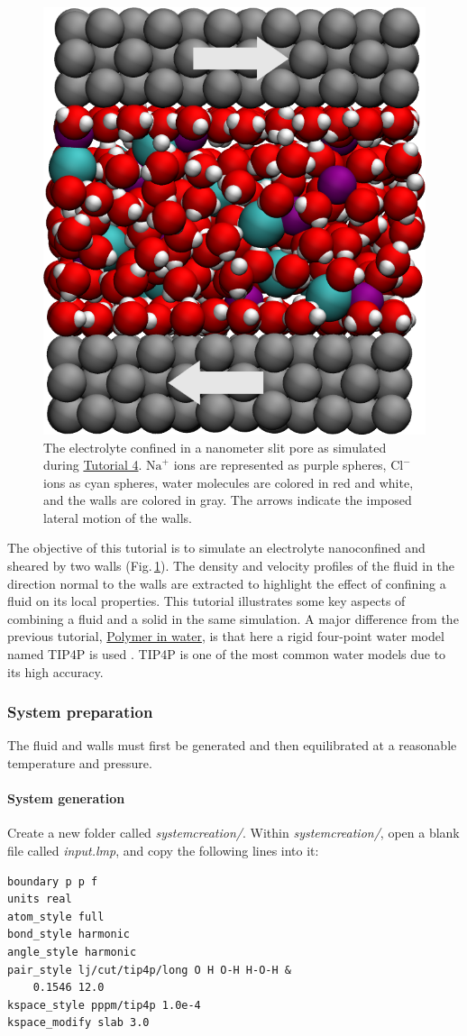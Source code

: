 \documentclass[9pt,tutorial]{livecoms}
\begin{document}
\begin{figure}
\centering
\includegraphics[width=0.55\linewidth]{NANOSHEAR}
\caption{The electrolyte confined in a nanometer slit pore as simulated during
\hyperref[sheared-confined-label]{Tutorial 4}. $\text{Na}^+$ ions are represented
as purple spheres, $\text{Cl}^-$ ions as cyan spheres, water molecules are colored
in red and white, and the walls are colored in gray. The arrows indicate the
imposed lateral motion of the walls.}
\label{fig:NANOSHEAR}
\end{figure}

\noindent The objective of this tutorial is to simulate an electrolyte
nanoconfined and sheared by two walls (Fig.\,\ref{fig:NANOSHEAR}). The density
and velocity profiles of the fluid in the direction normal to the walls are
extracted to highlight the effect of confining a fluid on its local properties.
This tutorial illustrates some key aspects of combining a fluid and a solid in
the same simulation. A major difference from the previous tutorial,
\hyperref[all-atoms-label]{Polymer in water}, is that here a rigid four-point
water model named TIP4P is used \cite{abascal2005general}. TIP4P is one of
the most common water models due to its high accuracy.

\subsubsection{System preparation}
The fluid and walls must first be generated and then equilibrated at a reasonable
temperature and pressure.

\paragraph{System generation}
Create a new folder called \textit{systemcreation/}. Within
\textit{systemcreation/}, open a blank file called \textit{input.lmp}, and
copy the following lines into it:
\begin{lstlisting}
boundary p p f
units real
atom_style full
bond_style harmonic
angle_style harmonic
pair_style lj/cut/tip4p/long O H O-H H-O-H &
    0.1546 12.0
kspace_style pppm/tip4p 1.0e-4
kspace_modify slab 3.0
\end{lstlisting}
\end{document}
